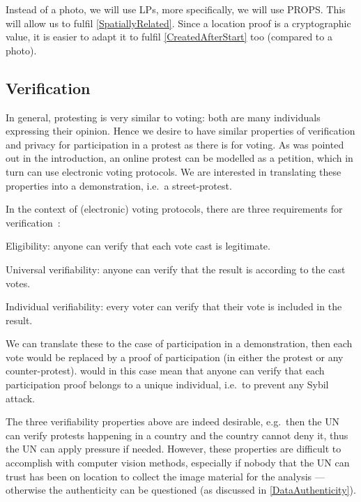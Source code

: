 Instead of a photo, we will use \acp{LP}, more specifically, we will use 
\ac{PROPS}.
This will allow us to fulfil \cref{SpatiallyRelated}.
Since a location proof is a cryptographic value, it is easier to adapt it to 
fulfil \cref{CreatedAfterStart} too (compared to a photo).

\subsection{Verification}
\label{Verification}

In general, protesting is very similar to voting: both are many individuals 
expressing their opinion.
Hence we desire to have similar properties of verification and privacy for 
participation in a protest as there is for voting.
As was pointed out in the introduction, an online protest can be modelled as 
a petition, which in turn can use electronic voting protocols.
We are interested in translating these properties into a demonstration, i.e.\ 
a street-protest.

In the context of (electronic) voting protocols, there are three requirements 
for verification~\cite{VerifyingPrivacyPropertiesOfVotingProtocols}:
\begin{frame}
\begin{requirements}[V]
\item\label{EligibilityVerif} Eligibility: anyone can verify that each vote 
  cast is legitimate.
\item\label{UniversalVerif} Universal verifiability: anyone can verify that the 
  result is according to the cast votes.
\item\label{IndividualVerif} Individual verifiability: every voter can verify 
  that their vote is included in the result.
\end{requirements}
\end{frame}
We can translate these to the case of participation in a demonstration, then 
each vote would be replaced by a proof of participation (in either the protest 
or any counter-protest).
 would in this case mean that anyone can verify that 
each participation proof belongs to a unique individual, i.e.\ to prevent any 
Sybil attack.

The three verifiability properties above are indeed desirable, e.g.\ then the 
\ac{UN} can verify protests happening in a country and the country cannot deny 
it, thus the \ac{UN} can apply pressure if needed.
However, these properties are difficult to accomplish with computer vision 
methods, especially if nobody that the \ac{UN} can trust has been on location 
to collect the image material for the analysis --- otherwise the authenticity 
can be questioned (as discussed in \cref{DataAuthenticity}).

